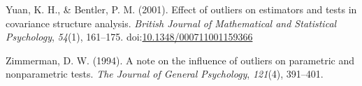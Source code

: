 \documentclass[english,,man,mask]{apa6}
\theoremstyle{definition}
\theoremstyle{definition}
\theoremstyle{definition}
\theoremstyle{remark}
\begin{document}
\hypertarget{ref-Yuan2001}{}
Yuan, K. H., \& Bentler, P. M. (2001). Effect of outliers on estimators
and tests in covariance structure analysis. \emph{British Journal of
Mathematical and Statistical Psychology}, \emph{54}(1), 161--175.
doi:\href{https://doi.org/10.1348/000711001159366}{10.1348/000711001159366}

\hypertarget{ref-Zimmerman1994}{}
Zimmerman, D. W. (1994). A note on the influence of outliers on
parametric and nonparametric tests. \emph{The Journal of General
Psychology}, \emph{121}(4), 391--401.
\end{document}

